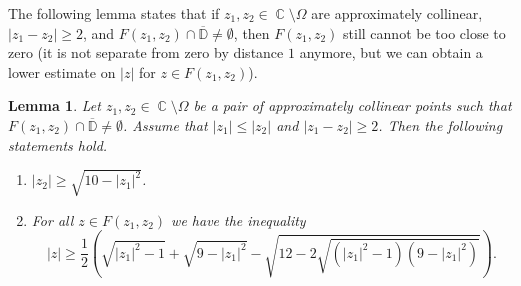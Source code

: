 \documentclass{amsart}
\numberwithin{equation}{section}
\newtheorem{lemma}[theorem]{Lemma}
\theoremstyle{definition}
\theoremstyle{remark}
\DeclareMathOperator{\CC}{\mathbb C}
\begin{document}
	The following lemma states that if $z_1, z_2 \in \CC\setminus \Omega$ are approximately collinear, $|z_1-z_2| \ge 2$, and $F(z_1,z_2) \cap \overline{\mathbb D} \ne \emptyset$, then $F(z_1, z_2)$ still cannot be too close to zero (it is not separate from zero by distance $1$ anymore, but we can obtain a lower estimate on $|z|$ for $z \in F(z_1,z_2)$).
	
	\begin{lemma}\label{lemPropertiesOfIntersectingCirclesInvolved}
		Let $z_1,z_2 \in \CC \setminus \Omega$ be a pair of approximately collinear points such that $F(z_1,z_2) \cap \overline{\mathbb D} \ne \emptyset$. Assume that $|z_1| \le |z_2|$ and $|z_1 - z_2| \ge 2$. Then the following statements hold.
		\begin{enumerate}[label=(\roman*)]
			\item\label{CirclePropertyIi} $|z_2| \ge \sqrt{10 - |z_1|^2}$.
			\item\label{CirclePropertyIii} For all $z \in F(z_1,z_2)$ we have the inequality
			\[|z| \ge \dfrac{1}{2}\left(\sqrt{|z_1|^2 - 1} + \sqrt{9 - |z_1|^2} - \sqrt{12 -2\sqrt{(|z_1|^2 - 1)(9 - |z_1|^2)}}\right).\]
		\end{enumerate}
	\end{lemma}
\end{document}

